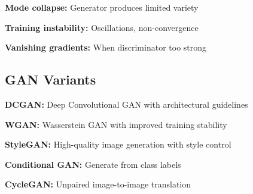 \textbf{Mode collapse:} Generator produces limited variety

\textbf{Training instability:} Oscillations, non-convergence

\textbf{Vanishing gradients:} When discriminator too strong

\subsection{GAN Variants}

\textbf{DCGAN:} Deep Convolutional GAN with architectural guidelines

\textbf{WGAN:} Wasserstein GAN with improved training stability

\textbf{StyleGAN:} High-quality image generation with style control

\textbf{Conditional GAN:} Generate from class labels

\textbf{CycleGAN:} Unpaired image-to-image translation





